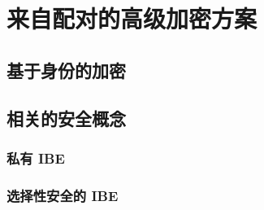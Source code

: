 \section{来自配对的高级加密方案}\label{sec:15-6}

\subsection{基于身份的加密}\label{subsec:15-6-1}

\begin{definition}\label{def:15-7}
	
\end{definition}

\begin{game}[语义安全性]\label{game:15-4}
	
\end{game}

\begin{definition}\label{def:15-8}
	
\end{definition}

\subsection{相关的安全概念}\label{subsec:15-6-2}

\subsubsection{私有 IBE}\label{subsubsec:15-6-2-1}

\begin{game}[私有 IBE]\label{game:15-5}
	
\end{game}

\begin{definition}[私有 IBE]\label{def:15-9}
	
\end{definition}

\subsubsection{选择性安全的 IBE}\label{subsubsec:15-6-2-2}

\begin{game}[选择性语义安全性]\label{game:15-6}
	
\end{game}

\begin{definition}[选择性安全性]\label{def:15-10}
	
\end{definition}

